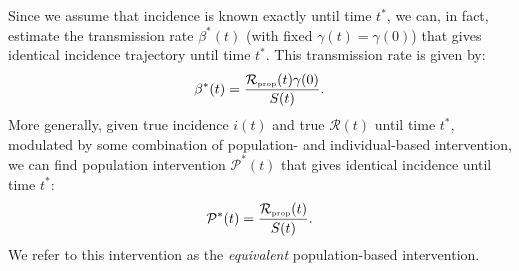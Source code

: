 \documentclass[12pt]{article}
\newcommand{\RR}{\ensuremath{{\mathcal R}}\xspace}
\newcommand{\tsub}[2]{#1_{{\textrm{\tiny #2}}}}
\newcommand{\PP}{{\mathcal P}}
\begin{document}
Since we assume that incidence is known exactly until time $t^\ast$, we can, in fact, estimate the transmission rate $\beta^\ast(t)$ (with fixed $\gamma(t)=\gamma(0)$) that gives identical incidence trajectory until time $t^\ast$.
This transmission rate is given by:
\begin{equation}
\beta^\ast(t) = \frac{\tsub{\RR}{prop}(t)\gamma(0)}{S(t)}.
\end{equation}
More generally, given true incidence $i(t)$ and true $\RR(t)$ until time $t^\ast$, modulated by some combination of population- and individual-based intervention, we can find population intervention $\PP^\ast(t)$ that gives identical incidence until time $t^\ast$:
\begin{equation}
\PP^\ast(t) = \frac{\tsub{\RR}{prop}(t)}{S(t)}.
\end{equation}
We refer to this intervention as the \emph{equivalent} population-based intervention.


\end{document}

